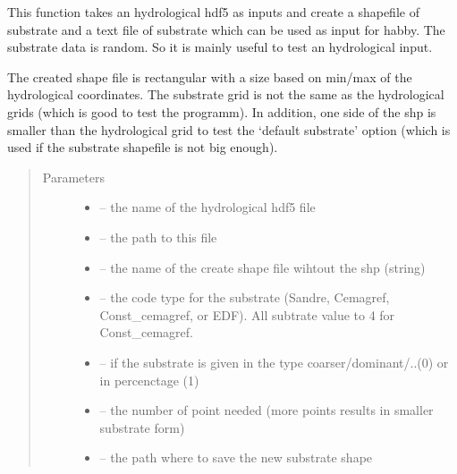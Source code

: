 \documentclass[letterpaper,10pt,english]{sphinxmanual}
\begin{document}
\begin{fulllineitems}
\label{\detokenize{index:src.substrate.create_dummy_substrate_from_hydro}}
This function takes an hydrological hdf5 as inputs and create a shapefile of substrate and a text file of substrate
which can be used as input for habby. The substrate data is random. So it is mainly useful to test an hydrological
input.

The created shape file is rectangular with a size based on min/max of the hydrological coordinates. The substrate
grid is not the same as the hydrological grids (which is good to test the programm). In addition, one side of the shp
is smaller than the hydrological grid to test the `default substrate' option (which is used if the substrate
shapefile is not big enough).
\begin{quote}\begin{description}
\item[{Parameters}] \leavevmode\begin{itemize}
\item {} 
 -- the name of the hydrological hdf5 file

\item {} 
 -- the path to this file

\item {} 
 -- the name of the create shape file wihtout the shp (string)

\item {} 
 -- the code type for the substrate (Sandre, Cemagref, Const\_cemagref, or EDF). All subtrate value
to 4 for Const\_cemagref.

\item {} 
 -- if the substrate is given in the type coarser/dominant/..(0) or in percenctage (1)

\item {} 
 -- the number of point needed (more points results in smaller substrate form)

\item {} 
 -- the path where to save the new substrate shape

\end{itemize}

\end{description}\end{quote}

\end{fulllineitems}
\end{document}
